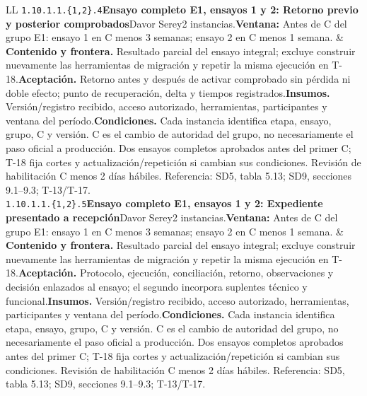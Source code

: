 \begin{longtable}{L{\tabcolsep\relax}L{\tabcolsep\relax}}
\texttt{1.\allowbreak{}10.\allowbreak{}1.\allowbreak{}1.\allowbreak{}\{1,\allowbreak{}2\}.\allowbreak{}4}\newline{}\textbf{Ensayo completo E1, ensayos 1 y 2: Retorno previo y posterior comprobados}\newline{}Davor Serey\newline{}2 instancias.\newline{}\textbf{Ventana:} Antes de C del grupo E1: ensayo 1 en C menos 3 semanas; ensayo 2 en C menos 1 semana. & \textbf{Contenido y frontera.} Resultado parcial del ensayo integral; excluye construir nuevamente las herramientas de migración y repetir la misma ejecución en T-18.\newline{}\textbf{Aceptación.} Retorno antes y después de activar comprobado sin pérdida ni doble efecto; punto de recuperación, delta y tiempos registrados.\newline{}\textbf{Insumos.} Versión/registro recibido, acceso autorizado, herramientas, participantes y ventana del período.\newline{}\textbf{Condiciones.} Cada instancia identifica etapa, ensayo, grupo, C y versión. C es el cambio de autoridad del grupo, no necesariamente el paso oficial a producción. Dos ensayos completos aprobados antes del primer C; T-18 fija cortes y actualización/repetición si cambian sus condiciones. Revisión de habilitación C menos 2 días hábiles. Referencia: SD5, tabla 5.13; SD9, secciones 9.1--9.3; T-13/T-17.\\\hline
\texttt{1.\allowbreak{}10.\allowbreak{}1.\allowbreak{}1.\allowbreak{}\{1,\allowbreak{}2\}.\allowbreak{}5}\newline{}\textbf{Ensayo completo E1, ensayos 1 y 2: Expediente presentado a recepción}\newline{}Davor Serey\newline{}2 instancias.\newline{}\textbf{Ventana:} Antes de C del grupo E1: ensayo 1 en C menos 3 semanas; ensayo 2 en C menos 1 semana. & \textbf{Contenido y frontera.} Resultado parcial del ensayo integral; excluye construir nuevamente las herramientas de migración y repetir la misma ejecución en T-18.\newline{}\textbf{Aceptación.} Protocolo, ejecución, conciliación, retorno, observaciones y decisión enlazados al ensayo; el segundo incorpora suplentes técnico y funcional.\newline{}\textbf{Insumos.} Versión/registro recibido, acceso autorizado, herramientas, participantes y ventana del período.\newline{}\textbf{Condiciones.} Cada instancia identifica etapa, ensayo, grupo, C y versión. C es el cambio de autoridad del grupo, no necesariamente el paso oficial a producción. Dos ensayos completos aprobados antes del primer C; T-18 fija cortes y actualización/repetición si cambian sus condiciones. Revisión de habilitación C menos 2 días hábiles. Referencia: SD5, tabla 5.13; SD9, secciones 9.1--9.3; T-13/T-17.\\\hline

\end{longtable}
